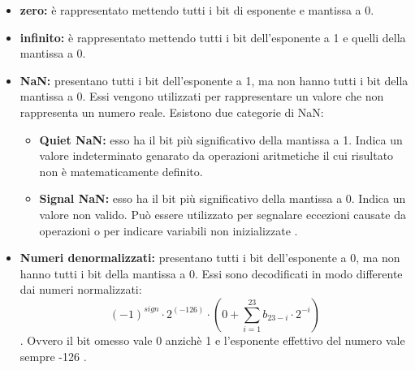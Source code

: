 \documentclass[]{IEEEtran}
\begin{document}
\begin{itemize}
    \item \textbf{zero:} è rappresentato mettendo tutti i bit di esponente e mantissa a 0.
    \item \textbf{infinito:} è rappresentato mettendo tutti i bit dell'esponente a 1 e quelli della mantissa a 0.
    \item \textbf{NaN:} presentano tutti i bit dell'esponente a 1, ma non hanno tutti i bit della mantissa a 0. Essi vengono utilizzati per rappresentare un valore che non rappresenta un numero reale. Esistono due categorie di NaN:
          \begin{itemize}
              \item \textbf{Quiet NaN:} esso ha il bit più significativo della mantissa a 1. Indica un valore indeterminato genarato da operazioni aritmetiche il cui risultato non è matematicamente definito.
              \item \textbf{Signal NaN:} esso ha il bit più significativo della mantissa a 0. Indica un valore non valido. Può essere utilizzato per segnalare eccezioni causate da operazioni o per indicare variabili non inizializzate .
          \end{itemize}
    \item \textbf{Numeri denormalizzati:} presentano tutti i bit dell'esponente a 0, ma non hanno tutti i bit della mantissa a 0. Essi sono decodificati in modo differente dai numeri normalizzati: $$(-1)^{sign}\cdot 2^{(-126)} \cdot (0 + \sum_{i=1}^{23}b_{23-i}\cdot 2^{-i})$$. Ovvero il bit omesso vale 0 anzichè 1 e l'esponente effettivo del numero vale sempre -126  \cite{IEEE754Online}.
\end{itemize}
\end{document}
